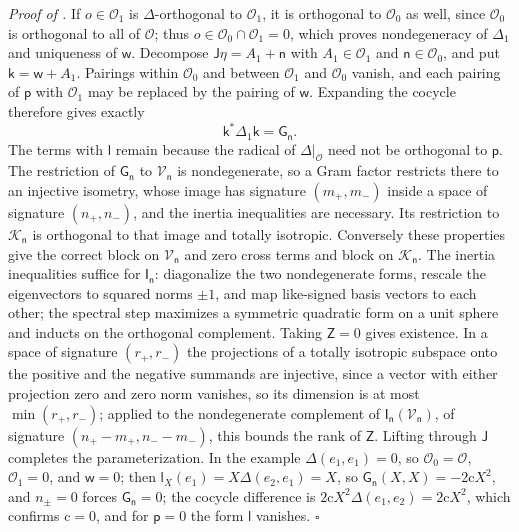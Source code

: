 \noindent\emph{Proof of .}
If \(o\in\mathcal O_1\) is \(\Delta\)-orthogonal to \(\mathcal O_1\), it is orthogonal to \(\mathcal O_0\)
as well, since \(\mathcal O_0\) is orthogonal to all of \(\mathcal O\); thus \(o\in\mathcal O_0\cap\mathcal O_1=0\),
which proves nondegeneracy of \(\Delta_1\) and uniqueness of \(\mathsf w\). Decompose
\(\mathsf J\eta=A_1+\mathsf n\) with \(A_1\in\mathcal O_1\) and \(\mathsf n\in\mathcal O_0\), and put
\(\mathsf k=\mathsf w+A_1\). Pairings within \(\mathcal O_0\) and between \(\mathcal O_1\) and
\(\mathcal O_0\) vanish, and each pairing of \(\mathsf p\) with \(\mathcal O_1\) may be replaced by the
pairing of \(\mathsf w\). Expanding the cocycle therefore gives exactly
\begin{equation}
\mathsf k^*\Delta_1\mathsf k=\mathsf G_{\mathsf n}.
\label{eq:pb-defect-signed-gram-factor}
\end{equation}
The terms with \(\mathsf l\) remain because the radical of \(\Delta|_{\mathcal O}\) need not be orthogonal
to \(\mathsf p\). The restriction of \(\mathsf G_{\mathsf n}\) to \(\mathcal V_{\mathsf n}\) is
nondegenerate, so a Gram factor restricts there to an injective isometry, whose image has signature
\((m_+,m_-)\) inside a space of signature \((n_+,n_-)\), and the inertia inequalities are necessary. Its
restriction to \(\mathcal K_{\mathsf n}\) is orthogonal to that image and totally isotropic. Conversely
these properties give the correct block on \(\mathcal V_{\mathsf n}\) and zero cross terms and block on
\(\mathcal K_{\mathsf n}\). The inertia inequalities suffice for \(\mathsf I_{\mathsf n}\): diagonalize
the two nondegenerate forms, rescale the eigenvectors to squared norms \(\pm1\), and map like-signed
basis vectors to each other; the spectral step maximizes a symmetric quadratic form on a unit sphere and
inducts on the orthogonal complement. Taking \(\mathsf Z=0\) gives existence. In a space of signature
\((r_+,r_-)\) the projections of a totally isotropic subspace onto the positive and the negative summands
are injective, since a vector with either projection zero and zero norm vanishes, so its dimension is at
most \(\min(r_+,r_-)\); applied to the nondegenerate complement of
\(\mathsf I_{\mathsf n}(\mathcal V_{\mathsf n})\), of signature \((n_+-m_+,n_--m_-)\), this bounds the rank
of \(\mathsf Z\). Lifting through \(\mathsf J\) completes the parameterization. In the example
\(\Delta(e_1,e_1)=0\), so \(\mathcal O_0=\mathcal O\), \(\mathcal O_1=0\), and \(\mathsf w=0\); then
\(\mathsf l_X(e_1)=X\Delta(e_2,e_1)=X\), so \(\mathsf G_{\mathsf n}(X,X)=-2\mathrm cX^2\), and
\(n_\pm=0\) forces \(\mathsf G_{\mathsf n}=0\); the cocycle difference is
\(2\mathrm cX^2\Delta(e_1,e_2)=2\mathrm cX^2\), which confirms \(\mathrm c=0\), and for \(\mathsf p=0\)
the form \(\mathsf l\) vanishes. \hfill$\square$

